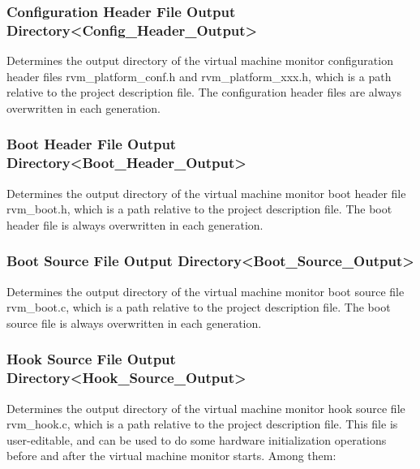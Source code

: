 \subsubsection{Configuration Header File Output Directory<Config\_Header\_Output>{}}\label{subsubsec:5-3-13-18}

Determines the output directory of the virtual machine monitor configuration header files rvm\_platform\_conf.h and rvm\_platform\_xxx.h, which is a path relative to the project description file. The configuration header files are always overwritten in each generation.

\subsubsection{Boot Header File Output Directory<Boot\_Header\_Output>{}}\label{subsubsec:5-3-13-19}

Determines the output directory of the virtual machine monitor boot header file rvm\_boot.h, which is a path relative to the project description file. The boot header file is always overwritten in each generation.

\subsubsection{Boot Source File Output Directory<Boot\_Source\_Output>{}}\label{subsubsec:5-3-13-20}

Determines the output directory of the virtual machine monitor boot source file rvm\_boot.c, which is a path relative to the project description file. The boot source file is always overwritten in each generation.

\subsubsection{Hook Source File Output Directory<Hook\_Source\_Output>{}}\label{subsubsec:5-3-13-21}

Determines the output directory of the virtual machine monitor hook source file rvm\_hook.c, which is a path relative to the project description file. This file is user-editable, and can be used to do some hardware initialization operations before and after the virtual machine monitor starts. Among them:

